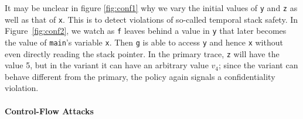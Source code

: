 \documentclass[acmsmall,review,anonymous]{acmart}\settopmatter{printfolios=true,printccs=false,printacmref=false}
\begin{document}
It may be unclear in figure \ref{fig:conf1} why we vary the initial values of {\tt y}
and {\tt z} as well as that of {\tt x}. This is to detect violations of so-called
temporal stack safety.
In Figure~\ref{fig:conf2}, we watch as {\tt f} leaves behind a value in {\tt y}
that later becomes the value of {\tt main}'s variable {\tt x}. Then {\tt g} is able to access
{\tt y} and hence {\tt x} without even directly reading the stack pointer.
In the primary trace, {\tt z} will have the value 5, but in the variant it can have
an arbitrary value $v_4$; since the variant can behave different from the primary,
the policy again signals a confidentiality violation.

\paragraph*{Control-Flow Attacks}
\end{document}
